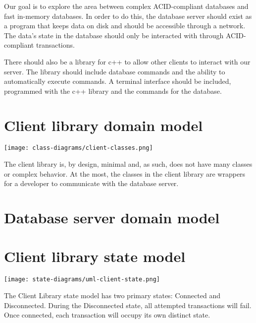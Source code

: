 \documentclass[a4paper]{report}
\begin{document}
	Our goal is to explore the area between complex ACID-compliant databases and fast in-memory databases. In order to do this, the database server should exist as a program that keeps data on disk and should be accessible through a network. The data’s state in the database should only be interacted with through ACID-compliant transactions.

	There should also be a library for c++ to allow other clients to interact with our server. The library should include database commands and the ability to automatically execute commands. A terminal interface should be included, programmed with the c++ library and the commands for the database.

\section{Client library domain model}

	\texttt{[image: class-diagrams/client-classes.png]}

	The client library is, by design, minimal and, as such, does not have many classes or complex behavior.  At the most, the classes in the client library are wrappers for a developer to communicate with the database server.

\newpage

\section{Database server domain model}

	\begin{center}
	\end{center}

\section{Client library state model}
	
	\begin{center}
		\texttt{[image: state-diagrams/uml-client-state.png]}
	\end{center}

	The Client Library state model has two primary states: Connected and Disconnected. During the Disconnected state, all attempted transactions will fail. Once connected, each transaction will occupy its own distinct state.
\end{document}
